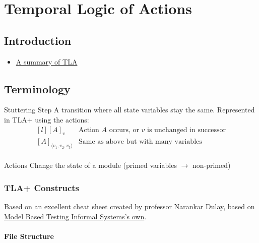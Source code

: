 \chapter{Temporal Logic of Actions}

\section{Introduction}



\begin{itemize}
    \item \href{https://lamport.azurewebsites.net/tla/summary-standalone.pdf}{A summary of TLA}
\end{itemize}
\unfinished

\section{Terminology}
\begin{definitionbox}{Stuttering Step}
    A transition where all state variables stay the same. Represented in TLA+ using the actions:
    \[\begin{matrix*}[l]
        [A]_v & \text{Action }A \text{ occurs, or }v \text{ is unchanged in successor} \\
        [A]_{\langle v_1,v_2,v_3\rangle} & \text{Same as above but with many variables} \\
    \end{matrix*}\]
\end{definitionbox}
\begin{definitionbox}{Actions}
    Change the state of a module (primed variables $\to$ non-primed)
\end{definitionbox}
\subsection{TLA+ Constructs}
Based on an excellent cheat sheet created by professor Narankar Dulay, based on \href{https://mbt.informal.systems/docs/tla_basics_tutorials/tla+cheatsheet.html}{Model Based Testing \@ Informal Systems's own}.

\subsubsection{File Structure}
\begin{minipage}{.48\textwidth}
    
\end{minipage}
\hfill
\begin{minipage}{.48\textwidth}
    \inputminted{text}{tla_plus/code/ExampleFile.tla}
\end{minipage}
\vspace{.3cm}

